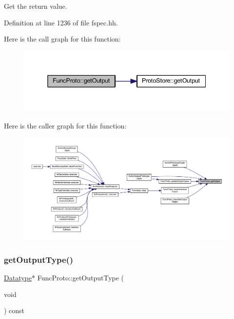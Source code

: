 Get the return value. 



Definition at line 1236 of file fspec.\+hh.

Here is the call graph for this function\+:
\nopagebreak
\begin{figure}[H]
\begin{center}
\leavevmode
\includegraphics[width=338pt]{class_func_proto_a92e6871d7ee764e7c5aa8b10bf47705a_cgraph}
\end{center}
\end{figure}
Here is the caller graph for this function\+:
\nopagebreak
\begin{figure}[H]
\begin{center}
\leavevmode
\includegraphics[width=350pt]{class_func_proto_a92e6871d7ee764e7c5aa8b10bf47705a_icgraph}
\end{center}
\end{figure}
\mbox{\label{class_func_proto_ad457e79208b6e7f4f030c2c325db1dba}} 
\subsubsection{\texorpdfstring{getOutputType()}{getOutputType()}}
{\footnotesize\ttfamily \mbox{\hyperlink{class_datatype}{Datatype}}$\ast$ Func\+Proto\+::get\+Output\+Type (\begin{DoxyParamCaption}\item[{void}]{ }\end{DoxyParamCaption}) const\hspace{0.3cm}{\ttfamily [inline]}}



